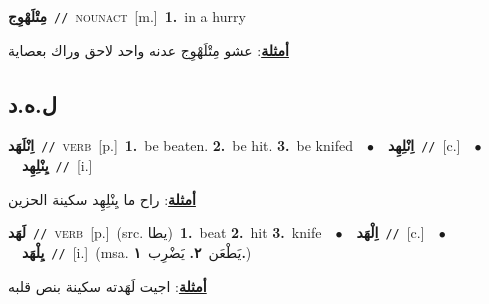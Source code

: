 \documentclass[10pt,a4paper,twoside]{article} %
\begin{document}
\begin{multicols}{2}
{\setlength\topsep{0pt}\textbf{\foreignlanguage{arabic}{مِتْلَهْوِج}}\ {\color{gray}\texttt{//}\color{black}}\ \textsc{noun\textunderscore act}\ [m.]\ \textbf{1.}~in a hurry\  \begin{flushright}\color{gray}\foreignlanguage{arabic}{\textbf{\underline{\foreignlanguage{arabic}{أمثلة}}}: عشو مِتْلَهْوِج عدنه واحد لاحق وراك بعصاية}\end{flushright}\color{black}} \vspace{2mm}

\vspace{-3mm}
\subsection*{\color{blue}\foreignlanguage{arabic}{ل.ه.د}\color{blue}{}} 

{\setlength\topsep{0pt}\textbf{\foreignlanguage{arabic}{اِنْلَهَد}}\ {\color{gray}\texttt{//}\color{black}}\ \textsc{verb}\ [p.]\ \textbf{1.}~be beaten.  \textbf{2.}~be hit.  \textbf{3.}~be knifed\ \ $\bullet$\ \ \setlength\topsep{0pt}\textbf{\foreignlanguage{arabic}{اِنْلِهِد}}\ {\color{gray}\texttt{//}\color{black}}\ [c.]\ \ $\bullet$\ \ \setlength\topsep{0pt}\textbf{\foreignlanguage{arabic}{يِنْلِهِد}}\ {\color{gray}\texttt{//}\color{black}}\ [i.]\  \begin{flushright}\color{gray}\foreignlanguage{arabic}{\textbf{\underline{\foreignlanguage{arabic}{أمثلة}}}: راح ما يِنْلِهِد سكينة الحزين}\end{flushright}\color{black}} \vspace{2mm}

{\setlength\topsep{0pt}\textbf{\foreignlanguage{arabic}{لَهَد}}\ {\color{gray}\texttt{//}\color{black}}\ \textsc{verb}\ [p.]\ (src. \color{gray}\foreignlanguage{arabic}{يطا}\color{black})\ \textbf{1.}~beat  \textbf{2.}~hit  \textbf{3.}~knife\ \ $\bullet$\ \ \setlength\topsep{0pt}\textbf{\foreignlanguage{arabic}{اِلْهَد}}\ {\color{gray}\texttt{//}\color{black}}\ [c.]\ \ $\bullet$\ \ \setlength\topsep{0pt}\textbf{\foreignlanguage{arabic}{يِلْهَد}}\ {\color{gray}\texttt{//}\color{black}}\ [i.]\ \color{gray}(msa. \foreignlanguage{arabic}{يَطْعَن}~\foreignlanguage{arabic}{\textbf{٢.}}  \foreignlanguage{arabic}{يَضْرِب}~\foreignlanguage{arabic}{\textbf{١.}})\color{black}\  \begin{flushright}\color{gray}\foreignlanguage{arabic}{\textbf{\underline{\foreignlanguage{arabic}{أمثلة}}}: اجيت لَهَدته سكينة بنص قلبه}\end{flushright}\color{black}} \vspace{2mm}


\end{multicols}
\end{document}
